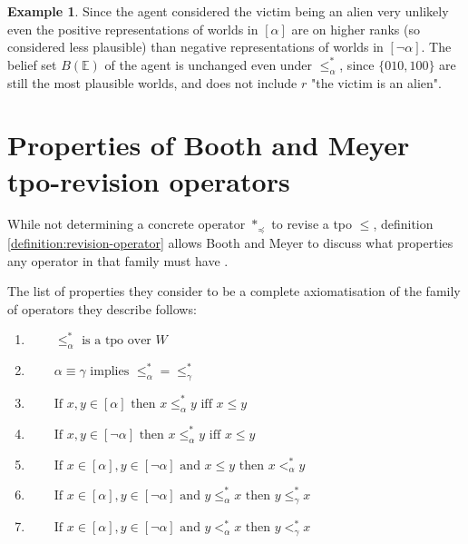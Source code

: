 \documentclass[english, 12pt]{scrartcl}
\theoremstyle{definition}
\newtheorem{example}{Example}[section]
\theoremstyle{definition}
\theoremstyle{definition}
\begin{document}
\begin{example}
    Since the agent considered the victim being an alien very unlikely even the positive representations of worlds in $[\alpha]$ are on higher ranks (so considered less plausible) than negative representations of worlds in $[\neg\alpha]$.
    The belief set $B(\mathbb{E})$ of the agent is unchanged even under $\leq_{\alpha}^{\ast}$, since $\{010, 100\}$ are still the most plausible worlds, and does not include $r$ "the victim is an alien".
\end{example}



\section{Properties of Booth and Meyer tpo-revision operators}
While not determining a concrete operator $\ast_{\preceq}$ to revise a tpo $\leq$, definition \ref{definition:revision-operator} allows Booth and Meyer to discuss what properties any operator in that family must have \cite{Booth2011}.

The list of properties they consider to be a complete axiomatisation of the family of operators they describe follows:

\begin{enumerate}[wide=0pt, widest=99,leftmargin=\parindent,label = ($\ast\arabic*$)]
    \item\label{AST1} $\qquad \leq_{\alpha}^{\ast} \textrm{ is a tpo over } W$
    \item\label{AST2} $\qquad\alpha \equiv \gamma \textrm{ implies } \leq_{\alpha}^{\ast}=\leq_{\gamma}^{\ast}$
    \item\label{AST3} $\qquad \textrm{If } x, y \in [\alpha] \textrm{ then } x \leq_{\alpha}^{\ast} y \textrm{ iff } x \leq y$
    \item\label{AST4} $\qquad \textrm{If } x, y \in [\neg\alpha] \textrm{ then } x \leq_{\alpha}^{\ast} y \textrm{ iff } x \leq y$
    \item\label{AST5} $\qquad \textrm{If } x \in [\alpha], y \in [\neg\alpha] \textrm{ and } x \leq y \textrm{ then } x <_{\alpha}^{\ast} y$
    \item\label{AST6} $\qquad \textrm{If } x \in [\alpha], y \in [\neg\alpha] \textrm{ and } y \leq_{\alpha}^{\ast} x \textrm{ then } y \leq_{\gamma}^{\ast} x$
    \item\label{AST7} $\qquad \textrm{If } x \in [\alpha], y \in [\neg\alpha] \textrm{ and } y <_{\alpha}^{\ast} x \textrm{ then } y <_{\gamma}^{\ast} x$
\end{enumerate}
\end{document}
